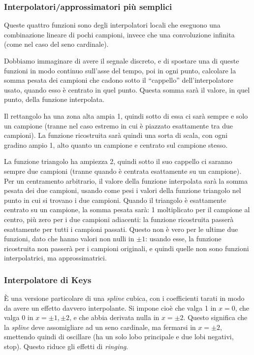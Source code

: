 \documentclass[a4paper,11pt]{article}
\begin{document}
\subsubsection{Interpolatori/approssimatori più semplici}
Queste quattro funzioni sono degli interpolatori locali che eseguono una combinazione lineare di pochi campioni, invece che una convoluzione infinita (come nel caso del seno cardinale).
\par
Dobbiamo immaginare di avere il segnale discreto, e di spostare una di queste funzioni in modo continuo sull'asse del tempo, poi in ogni punto,
calcolare la somma pesata dei campioni che cadono sotto il ``cappello'' dell'interpolatore usato, quando esso è centrato in quel punto. Questa somma sarà il valore, in quel punto, della funzione
interpolata.
\par
Il rettangolo ha una zona alta ampia 1, quindi sotto di essa ci sarà sempre e solo un campione (tranne nel caso estremo in cui è piazzato esattamente tra due campioni).
La funzione ricostruita sarà quindi una sorta di scala, con ogni gradino ampio 1, alto quanto un campione e centrato sul campione stesso.
\par
La funzione triangolo ha ampiezza 2, quindi sotto il suo cappello ci saranno sempre due campioni (tranne quando è centrata esattamente su un campione). Per un centramento
arbitrario, il valore della funzione interpolata sarà la somma pesata dei due campioni, usando come pesi i valori della funzione triangolo nel punto in cui si trovano i due campioni.
Quando il triangolo è esattamente centrato su un campione, la somma pesata sarà: 1 moltiplicato per il campione al centro, più zero per i due campioni adiacenti: la funzione ricostruita
passerà esattamente per tutti i campioni passati. Questo non è vero per le ultime due funzioni, dato che hanno valori non nulli in $\pm 1$: usando esse, la funzione ricostruita
non passerà per i campioni originali, e quindi quelle non sono funzioni interpolatrici, ma approssimatrici.

\subsubsection{Interpolatore di Keys}
È una versione particolare di una \textit{spline} cubica, con i coefficienti tarati in modo da avere un effetto davvero interpolante.
Si impone cioè che valga 1 in $x=0$, che valga 0 in $x = \pm 1, \pm 2$, e che abbia derivata nulla in $x = \pm 2$. Questo significa che la \textit{spline}
deve assomigliare ad un seno cardinale, ma fermarsi in $x = \pm 2$, smettendo quindi di oscillare (ha un solo lobo principale e due lobi negativi, stop).
Questo riduce gli effetti di \textit{ringing}.
\end{document}
